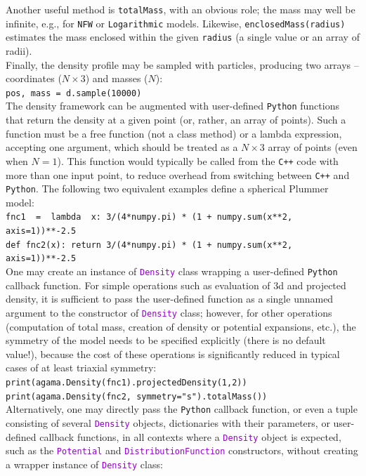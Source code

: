 \documentclass[12pt]{article}
\newcommand{\Cpp}  {\texttt{C++}\xspace}
\newcommand{\Python}{\texttt{Python}\xspace}
\newcommand{\ttt}[1]{\textcolor{darkviolet}{\texttt{#1}}}
\newcommand{\ppp}[1]{\textcolor{darkolive} {\texttt{#1}}}
\begin{document}
Another useful method is \texttt{totalMass}, with an obvious role; the mass may well be infinite, e.g., for \ppp{NFW} or \ppp{Logarithmic} models. Likewise, \texttt{enclosedMass(radius)} estimates the mass enclosed within the given \texttt{radius} (a single value or an array of radii).\\[2mm]
Finally, the density profile may be sampled with particles, producing two arrays -- coordinates ($N\times3$) and masses ($N$): \\
\texttt{pos, mass = d.sample(10000)}\\[2mm]
The density framework can be augmented with user-defined \Python functions that return the density at a given point (or, rather, an array of points). Such a function must be a free function (not a class method) or a lambda expression, accepting one argument, which should be treated as a $N\times3$ array of points (even when $N=1$). This function would typically be called from the \Cpp code with more than one input point, to reduce overhead from switching between \Cpp and \Python. The following two equivalent examples define a spherical Plummer model:\\
\texttt{fnc1~~=~~lambda~~x:  3/(4*numpy.pi) * (1 + numpy.sum(x**2, axis=1))**-2.5}\\
\texttt{def fnc2(x):  return 3/(4*numpy.pi) * (1 + numpy.sum(x**2, axis=1))**-2.5}\\[2mm]
One may create an instance of \ttt{Density} class wrapping a user-defined \Python callback function. For simple operations such as evaluation of 3d and projected density, it is sufficient to pass the user-defined function as a single unnamed argument to the constructor of \ttt{Density} class; however, for other operations (computation of total mass, creation of density or potential expansions, etc.), the symmetry of the model needs to be specified explicitly (there is no default value!), because the cost of these operations is significantly reduced in typical cases of at least triaxial symmetry:\\
\texttt{print(agama.Density(fnc1).projectedDensity(1,2))}\\
\texttt{print(agama.Density(fnc2, symmetry="s").totalMass())}\\[2mm]
Alternatively, one may directly pass the \Python callback function, or even a tuple consisting of several \ttt{Density} objects, dictionaries with their parameters, or user-defined callback functions, in all contexts where a \ttt{Density} object is expected, such as the \ttt{Potential} and \ttt{DistributionFunction} constructors, without creating a wrapper instance of \ttt{Density} class: \\
\end{document}
